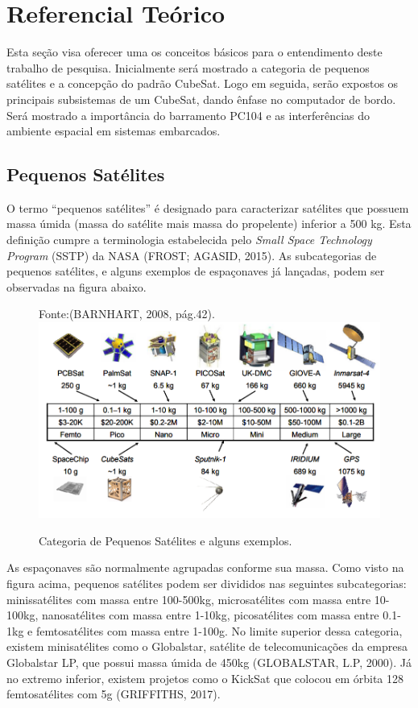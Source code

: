 \chapter[Referencial Teórico]{Referencial Teórico}

Esta seção visa oferecer uma os conceitos básicos para o entendimento deste trabalho de pesquisa. Inicialmente será mostrado a categoria de pequenos satélites e a concepção do padrão CubeSat. Logo em seguida, serão expostos os principais subsistemas de um CubeSat, dando ênfase no computador de bordo. Será mostrado a importância do barramento PC104 e as interferências do ambiente espacial em sistemas embarcados.


\section{Pequenos Satélites}

O termo “pequenos satélites” é designado para caracterizar satélites que possuem massa úmida (massa do satélite mais massa do propelente) inferior a 500 kg. Esta definição cumpre a terminologia estabelecida pelo \textit{Small Space Technology Program} (SSTP) da NASA (FROST; AGASID, 2015). As subcategorias de pequenos satélites, e alguns exemplos de espaçonaves já lançadas, podem ser observadas na figura abaixo.


\begin{figure}[h]
	\centering
	Fonte:(BARNHART, 2008, pág.42).
	\includegraphics[keepaspectratio=true,scale=0.55]{figuras/categoria_satellite.PNG}
	{\small\caption{Categoria de Pequenos Satélites e alguns exemplos.}}
	\label{fig02}
\end{figure}
\FloatBarrier

As espaçonaves são normalmente agrupadas conforme sua massa. Como visto na figura acima, pequenos satélites podem ser divididos nas seguintes subcategorias: minissatélites com massa entre 100-500kg, microsatélites com massa entre 10-100kg, nanosatélites com massa entre 1-10kg, picosatélites com massa entre 0.1-1kg e femtosatélites com massa entre 1-100g. No limite superior dessa categoria, existem minisatélites como o Globalstar, satélite de telecomunicações da empresa Globalstar LP, que possui massa úmida de 450kg (GLOBALSTAR, L.P, 2000). Já no extremo inferior, existem projetos como o KickSat que colocou em órbita 128 femtosatélites  com 5g (GRIFFITHS, 2017).

